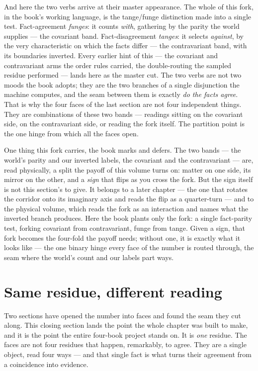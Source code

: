 And here the two verbs arrive at their master appearance. The whole of this fork, in the book's working language, is
the tange/funge distinction made into a single test. Fact-agreement \emph{funges}: it counts \emph{with}, gathering by
the parity the world supplies --- the covariant band. Fact-disagreement \emph{tanges}: it selects \emph{against}, by
the very characteristic on which the facts differ --- the contravariant band, with its boundaries inverted. Every
earlier hint of this --- the covariant and contravariant arms the order rules carried, the double-routing the sampled
residue performed --- lands here as the master cut. The two verbs are not two moods the book adopts; they are the two
branches of a single disjunction the machine computes, and the seam between them is exactly \emph{do the facts agree}.
That is why the four faces of the last section are not four independent things. They are combinations of these two
bands --- readings sitting on the covariant side, on the contravariant side, or reading the fork itself. The partition
point is the one hinge from which all the faces open.

One thing this fork carries, the book marks and defers. The two bands --- the world's parity and our inverted labels,
the covariant and the contravariant --- are, read physically, a split the payoff of this volume turns on: matter on one
side, its mirror on the other, and a \emph{sign} that flips as you cross the fork. But the sign itself is not this
section's to give. It belongs to a later chapter --- the one that rotates the corridor onto its imaginary axis and
reads the flip as a quarter-turn --- and to the physical volume, which reads the fork as an interaction and names what
the inverted branch produces. Here the book plants only the fork: a single fact-parity test, forking covariant from
contravariant, funge from tange. Given a sign, that fork becomes the four-fold the payoff needs; without one, it is
exactly what it looks like --- the one binary hinge every face of the number is routed through, the seam where the
world's count and our labels part ways.

\section{Same residue, different reading}

Two sections have opened the number into faces and found the seam they cut along. This closing section lands the point
the whole chapter was built to make, and it is the point the entire four-book project stands on. It is \emph{one}
residue. The faces are not four residues that happen, remarkably, to agree. They are a single object, read four ways
--- and that single fact is what turns their agreement from a coincidence into evidence.

